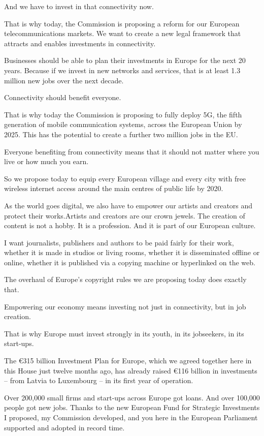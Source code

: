 \documentclass[a4paper,11pt]{article}
\begin{document}
And we have to invest in that connectivity now.

That is why today, the Commission is proposing a reform for our European telecommunications markets. We want to create a new legal framework that attracts and enables investments in connectivity.

Businesses should be able to plan their investments in Europe for the next 20 years. Because if we invest in new networks and services, that is at least 1.3 million new jobs over the next decade.

Connectivity should benefit everyone.

That is why today the Commission is proposing to fully deploy 5G, the fifth generation of mobile communication systems, across the European Union by 2025. This has the potential to create a further two million jobs in the EU.

Everyone benefiting from connectivity means that it should not matter where you live or how much you earn.

So we propose today to equip every European village and every city with free wireless internet access around the main centres of public life by 2020.

As the world goes digital, we also have to empower our artists and creators and protect their works.Artists and creators are our crown jewels. The creation of content is not a hobby. It is a profession. And it is part of our European culture.

I want journalists, publishers and authors to be paid fairly for their work, whether it is made in studios or living rooms, whether it is disseminated offline or online, whether it is published via a copying machine or hyperlinked on the web.

The overhaul of Europe's copyright rules we are proposing today does exactly that.

Empowering our economy means investing not just in connectivity, but in job creation.

That is why Europe must invest strongly in its youth, in its jobseekers, in its start-ups.

The \euro315 billion Investment Plan for Europe, which we agreed together here in this House just twelve months ago, has already raised \euro116 billion in investments – from Latvia to Luxembourg – in its first year of operation.

Over 200,000 small firms and start-ups across Europe got loans. And over 100,000 people got new jobs. Thanks to the new European Fund for Strategic Investments I proposed, my Commission developed, and you here in the European Parliament supported and adopted in record time.
\end{document}
